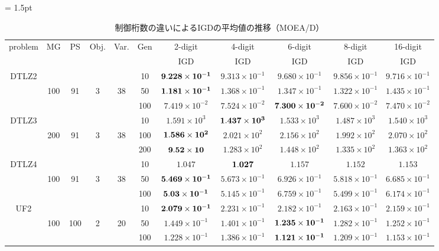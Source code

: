 \documentclass[../main/main]{subfiles}
\begin{document}
\begin{table}[htbp]
\fontsize{7.5pt}{7.5pt} \selectfont
\tabcolsep = 1.5pt
\centering
\caption{制御桁数の違いによるIGDの平均値の推移（MOEA/D）}
\label{tbl:igd_moead}
\begin{tabular}{c|ccccc|c|c|c|c|c}
\hline 
problem & MG & PS & Obj. & Var. & Gen & 2-digit & 4-digit & 6-digit & 8-digit & 16-digit \\ 
\cline{7-11}
&&&&&&IGD&IGD&IGD&IGD&IGD\\
\hline
\multirow{3}{*}{DTLZ2} &  &&      &       & 10 &$\bf{9.228 \times 10^{-1}}$ & $9.313 \times 10^{-1}$ & $9.680 \times 10^{-1}$ & $9.856 \times 10^{-1}$ & $9.716 \times 10^{-1}$\\
  				  &100 & 91 & 3 & 38 & 50 & $\bf{1.181 \times 10^{-1}}$ & $1.368 \times 10^{-1}$ & $1.347 \times 10^{-1}$ & $1.322 \times 10^{-1}$ & $1.435 \times 10^{-1}$\\
				   &        &   &&     &100 &$7.419 \times 10^{-2}$ & $7.524 \times 10^{-2}$ & $\bf{7.300 \times 10^{-2}}$ & $7.600 \times 10^{-2}$ & $7.470 \times 10^{-2}$\\
\hline
\multirow{3}{*}{DTLZ3} &      &&  &       & 10 &$1.591 \times 10^{3}$ & $\bf{1.437 \times 10^{3}}$ & $1.533 \times 10^{3}$ & $1.487 \times 10^{3}$ & $1.540 \times 10^{3}$\\
  				   &200 & 91 & 3 & 38 & 100 &$\bf{1.586 \times 10^{2}}$ & $2.021 \times 10^{2}$ & $2.156 \times 10^{2}$ & $1.992 \times 10^{2}$ & $2.070 \times 10^{2}$\\
				   &        &      &&  &200 &$\bf{9.52 \times 10}$ & $1.283 \times 10^{2}$ & $1.448 \times 10^{2}$ & $1.335 \times 10^{2}$ & $1.363 \times 10^{2}$\\

\hline
\multirow{3}{*}{DTLZ4} &   &&     &       & 10 &$1.047$ & $\bf{1.027}$ & $1.157$ & $1.152$ & $1.153$\\
  				   &100 & 91  & 3 & 38 & 50 &$\bf{5.469 \times 10^{-1}}$ & $5.673 \times 10^{-1}$ & $6.926 \times 10^{-1}$ & $5.818 \times 10^{-1}$ & $6.685 \times 10^{-1}$\\
				   &        &     &&   &100 &$\bf{5.03 \times 10^{-1}}$ & $5.145 \times 10^{-1}$ & $6.759 \times 10^{-1}$ & $5.499 \times 10^{-1}$ & $6.174 \times 10^{-1}$\\
\hline
\multirow{3}{*}{UF2} &        &     &&       & 10 &$\bf{2.079 \times 10^{-1}}$ & $2.231 \times 10^{-1}$ & $2.182 \times 10^{-1}$ & $2.163 \times 10^{-1}$ & $2.159 \times 10^{-1}$\\
  				   &100 & 100 & 2 & 20 & 50 &$1.449 \times 10^{-1}$ & $1.401 \times 10^{-1}$ & $\bf{1.235 \times 10^{-1}}$ & $1.282 \times 10^{-1}$ & $1.252 \times 10^{-1}$\\
				   &        &    &&    &100 &$1.228 \times 10^{-1}$ & $1.386 \times 10^{-1}$ & $\bf{1.121 \times 10^{-1}}$ & $1.209 \times 10^{-1}$ & $1.153 \times 10^{-1}$\\


\end{tabular}
\end{table}
\end{document}
